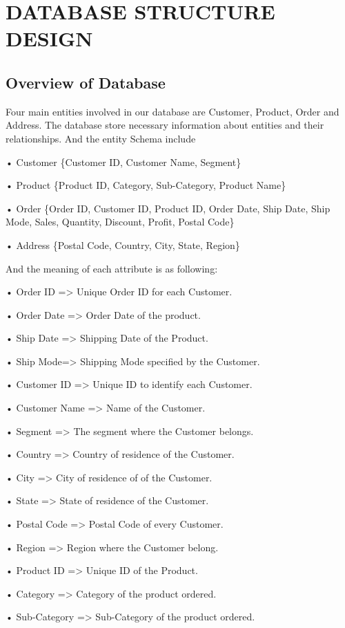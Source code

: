 \section{DATABASE STRUCTURE DESIGN}
\label{section:design}

\subsection{Overview of Database}
\label{sect:sub-title}
Four main entities involved in our database are Customer, Product, Order and Address. The database store necessary information about entities and their relationships. 
And the entity Schema include \par
• Customer \{Customer ID, Customer Name, Segment\}\par
• Product \{Product ID, Category, Sub-Category, Product Name\}\par
• Order \{Order ID, Customer ID, Product ID, Order Date, Ship Date, Ship Mode, Sales, Quantity, Discount, Profit, Postal Code\}\par
• Address \{Postal Code, Country, City, State, Region\}\par
And the meaning of each attribute is as following: \par
• Order ID => Unique Order ID for each Customer. \par
• Order Date => Order Date of the product. \par
• Ship Date => Shipping Date of the Product. \par
• Ship Mode=> Shipping Mode specified by the Customer. \par
• Customer ID => Unique ID to identify each Customer. \par
• Customer Name => Name of the Customer. \par
• Segment => The segment where the Customer belongs. \par
• Country => Country of residence of the Customer. \par
• City => City of residence of of the Customer. \par
• State => State of residence of the Customer. \par
• Postal Code => Postal Code of every Customer. \par
• Region => Region where the Customer belong. \par
• Product ID => Unique ID of the Product. \par 
• Category => Category of the product ordered. \par
• Sub-Category => Sub-Category of the product ordered. \par
